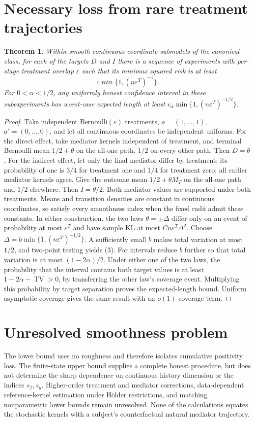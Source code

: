 \documentclass[11pt]{article}
\newtheorem{theorem}{Theorem}
\theoremstyle{definition}
\begin{document}
\section*{Necessary loss from rare treatment trajectories}
\begin{theorem}
Within smooth continuous-coordinate submodels of the canonical class,
for each of the targets $D$ and $I$ there is a sequence of experiments
with per-stage treatment overlap $\varepsilon$ such that its minimax
squared risk is at least
\[
 c\min\{1,(n\varepsilon^T)^{-1}\}.                     \tag{3}
\]
For $0<\alpha<1/2$, any uniformly honest confidence interval in these
subexperiments has worst-case expected length at least
$c_\alpha\min\{1,(n\varepsilon^T)^{-1/2}\}$.
\end{theorem}
\begin{proof}
Take independent Bernoulli$(\varepsilon)$ treatments, $a=(1,\ldots,1)$,
$a'=(0,\ldots,0)$, and let all continuous coordinates be independent
uniforms. For the direct effect, take mediator kernels independent of
treatment, and terminal Bernoulli mean $1/2+\theta$ on the all-one path,
$1/2$ on every other path. Then $D=\theta$.
For the indirect effect, let only the final mediator differ by treatment:
its probability of one is $3/4$ for treatment one and $1/4$ for treatment
zero; all earlier mediator kernels agree. Give the outcome mean
$1/2+\theta M_T$ on the all-one path and $1/2$ elsewhere. Then
$I=\theta/2$. Both mediator values are supported under both treatments.
Means and transition densities are constant in continuous coordinates,
so satisfy every smoothness index when the fixed radii admit these constants.
In either construction, the two laws $\theta=\pm\Delta$ differ only on
an event of probability at most $\varepsilon^T$ and have sample KL at
most $Cn\varepsilon^T\Delta^2$. Choose
$\Delta=b\min\{1,(n\varepsilon^T)^{-1/2}\}$.
A sufficiently small $b$ makes total variation at most $1/2$, and
two-point testing yields (3).
For intervals reduce $b$ further so that total variation is at most
$(1-2\alpha)/2$. Under either one of the two laws, the probability
that the interval contains both target values is at least
$1-2\alpha-\operatorname{TV}>0$, by transferring the other law's coverage
event. Multiplying this probability by target separation proves the
expected-length bound. Uniform asymptotic coverage gives the same result
with an $o(1)$ coverage term.
\end{proof}

\section*{Unresolved smoothness problem}
The lower bound uses no roughness and therefore isolates cumulative
positivity loss. The finite-state upper bound supplies a complete honest
procedure, but does not determine the sharp dependence on continuous
history dimension or the indices $s_f,s_y$. Higher-order treatment and
mediator corrections, data-dependent reference-kernel estimation under
H\"older restrictions, and matching nonparametric lower bounds remain
unresolved. None of the calculations equates the stochastic kernels with
a subject's counterfactual natural mediator trajectory.
\end{document}
